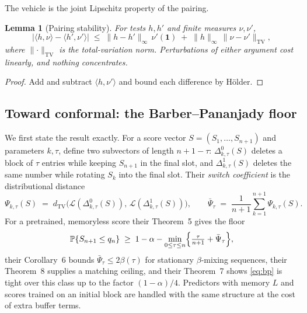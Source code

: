 \documentclass[11pt]{article}
\newtheorem{lemma}{Lemma}
\theoremstyle{remark}
\newcommand{\Prob}{\mathbb{P}}
\newcommand{\tv}[1]{\lVert #1\rVert_{\mathrm{TV}}}
\begin{document}
The vehicle is the joint Lipschitz property of the pairing.

\begin{lemma}[Pairing stability]\label{lem:pair}
For tests $h,h'$ and finite measures $\nu,\nu'$,
\[
\bigl|\langle h,\nu\rangle-\langle h',\nu'\rangle\bigr|
\;\le\;\|h-h'\|_\infty\,\nu'(\mathbf 1)\;+\;\|h\|_\infty\,\tv{\nu-\nu'},
\]
where $\tv{\cdot}$ is the total-variation norm. Perturbations of either argument cost linearly,
and nothing concentrates.
\end{lemma}

\begin{proof}
Add and subtract $\langle h,\nu'\rangle$ and bound each difference by H\"older.
\end{proof}

\subsection{Toward conformal: the Barber--Pananjady floor}\label{sec:bp}

We first state the result exactly. For a score vector $S=(S_1,\dots,S_{n+1})$ and parameters
$k,\tau$, \citet{barberpananjady2026} define two subvectors of length $n+1-\tau$:
$\Delta^{0}_{k,\tau}(S)$ deletes a block of $\tau$ entries while keeping $S_{n+1}$ in the final
slot, and $\Delta^{1}_{k,\tau}(S)$ deletes the same number while rotating $S_k$ into the final
slot. Their \emph{switch coefficient} is the distributional distance
\[
\Psi_{k,\tau}(S)\;=\;d_{\mathrm{TV}}\bigl(\mathcal L(\Delta^{0}_{k,\tau}(S)),\,
\mathcal L(\Delta^{1}_{k,\tau}(S))\bigr),
\qquad
\bar\Psi_\tau\;=\;\frac1{n+1}\sum_{k=1}^{n+1}\Psi_{k,\tau}(S).
\]
For a pretrained, memoryless score their Theorem~5 gives the floor
\begin{equation}\label{eq:bp}
\Prob\{S_{n+1}\le q_n\}\;\ge\;1-\alpha-\min_{0\le\tau\le n}
\Bigl\{\tfrac{\tau}{n+1}+\bar\Psi_\tau\Bigr\},
\end{equation}
their Corollary~6 bounds $\bar\Psi_\tau\le 2\beta(\tau)$ for stationary $\beta$-mixing sequences,
their Theorem~8 supplies a matching ceiling, and their Theorem~7 shows \eqref{eq:bp} is tight
over this class up to the factor $(1-\alpha)/4$. Predictors with memory $L$ and scores trained on
an initial block are handled with the same structure at the cost of extra buffer terms.
\end{document}
